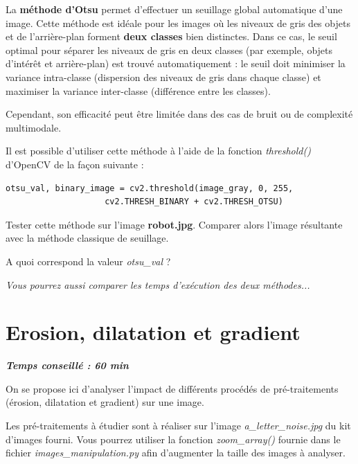 \documentclass[a4paper,11pt,titlepage]{article} %
\begin{document}
La \textbf{méthode d'Otsu} permet d'effectuer un seuillage global automatique d'une image. Cette méthode est idéale pour les images où les niveaux de gris des objets et de l'arrière-plan forment \textbf{deux classes} bien distinctes. Dans ce cas, le seuil optimal pour séparer les niveaux de gris en deux classes (par exemple, objets d'intérêt et arrière-plan) est trouvé automatiquement : le seuil doit minimiser la variance intra-classe (dispersion des niveaux de gris dans chaque classe) et maximiser la variance inter-classe (différence entre les classes).

Cependant, son efficacité peut être limitée dans des cas de bruit ou de complexité multimodale.

\medskip

Il est possible d'utiliser cette méthode à l'aide de la fonction \textsl{threshold()} d'OpenCV de la façon suivante : 

\begin{lstlisting}
otsu_val, binary_image = cv2.threshold(image_gray, 0, 255, 
					cv2.THRESH_BINARY + cv2.THRESH_OTSU)
\end{lstlisting}

\Manip Tester cette méthode sur l'image \textbf{robot.jpg}. Comparer alors l'image résultante avec la méthode classique de seuillage.

\Quest A quoi correspond la valeur \textsl{otsu\_val} ?

\textit{Vous pourrez aussi comparer les temps d'exécution des deux méthodes...}


\section{Erosion, dilatation et gradient}

\begin{center} \textbf{\textit{Temps conseillé : 60 min}} \end{center}

On se propose ici d'analyser l'impact de différents procédés de pré-traitements (érosion, dilatation et gradient) sur une image.

\medskip

Les pré-traitements à étudier sont à réaliser sur l'image \textsl{a\_letter\_noise.jpg} du kit d'images fourni. Vous pourrez utiliser la fonction \textsl{zoom\_array()} fournie dans le fichier \textsl{images\_manipulation.py} afin d'augmenter la taille des images à analyser. 
\end{document}
